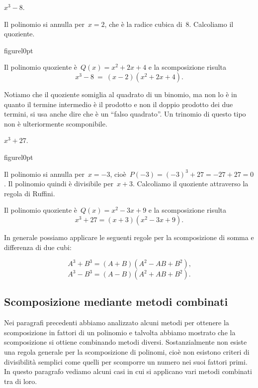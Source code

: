 \begin{exrig}
 \begin{esempio}
 $x^{3}-8$.
\end{esempio}
Il polinomio si annulla per~$x=2$, che è la radice cubica di~8.
Calcoliamo il quoziente.
\begin{wrapfloat}{figure}{l}{0pt}
 
\end{wrapfloat}
Il polinomio quoziente è~$Q(x)=x^{2}+2x+4$ e la scomposizione risulta
\[x^{3}-8\ =\ (x-2)(x^{2}+2x+4).\]

Notiamo che il quoziente somiglia al quadrato di un binomio, ma non lo
è in quanto il termine intermedio è il prodotto e non il doppio
prodotto dei due termini, si usa anche dire che è un ``falso quadrato''.
Un trinomio di questo tipo non è ulteriormente scomponibile.


 \begin{esempio}
 $x^{3}+27$.
 \end{esempio}
 \begin{wrapfloat}{figure}{l}{0pt}
 
\end{wrapfloat}
Il polinomio si annulla per~$x=-3$, cioè~$P(-3)=(-3)^{3}+27=-27+27=0$.
Il polinomio quindi è divisibile per~$x+3$. Calcoliamo il quoziente
attraverso la regola di Ruffini.

Il polinomio quoziente è~$Q(x)=x^{2}-3x+9$ e la scomposizione risulta
\[x^{3}+27=(x+3)(x^{2}-3x+9).\]

\end{exrig}

In generale possiamo applicare le seguenti regole per la scomposizione
di somma e differenza di due cubi:

\[A^{3}+B^{3}=(A+B)(A^{2}-AB+B^{2})\text{,}\]
\[A^{3}-B^{3}=(A-B)(A^{2}+AB+B^{2}).\]

\ovalbox{\risolvii \ref{ese:13.85}, \ref{ese:13.86}, \ref{ese:13.87}}

\subsection{Scomposizione mediante metodi combinati}

Nei paragrafi precedenti abbiamo analizzato alcuni metodi per ottenere
la scomposizione in fattori di un polinomio e talvolta abbiamo mostrato
che la scomposizione si ottiene combinando metodi diversi.
Sostanzialmente non esiste una regola generale per la scomposizione di
polinomi, cioè non esistono criteri di divisibilità semplici come
quelli per scomporre un numero nei suoi fattori primi. In questo
paragrafo vediamo alcuni casi in cui si applicano vari metodi combinati
tra di loro.

